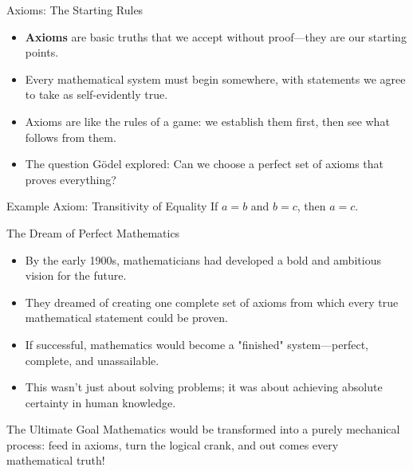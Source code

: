 \documentclass[aspectratio=169]{beamer}
\begin{document}
\begin{frame}{Axioms: The Starting Rules}

\begin{itemize}
    \item \textbf{Axioms} are basic truths that we accept without proof—they are our starting points.
    \item Every mathematical system must begin somewhere, with statements we agree to take as self-evidently true.
    \item Axioms are like the rules of a game: we establish them first, then see what follows from them.
    \item The question Gödel explored: Can we choose a perfect set of axioms that proves everything?
\end{itemize}

\begin{block}{Example Axiom: Transitivity of Equality}
If $a = b$ and $b = c$, then $a = c$.
\end{block}

\end{frame}

\begin{frame}{The Dream of Perfect Mathematics}

\begin{itemize}
    \item By the early 1900s, mathematicians had developed a bold and ambitious vision for the future.
    \item They dreamed of creating one complete set of axioms from which every true mathematical statement could be proven.
    \item If successful, mathematics would become a "finished" system—perfect, complete, and unassailable.
    \item This wasn't just about solving problems; it was about achieving absolute certainty in human knowledge.
\end{itemize}

\begin{alertblock}{The Ultimate Goal}
Mathematics would be transformed into a purely mechanical process: feed in axioms, turn the logical crank, and out comes every mathematical truth!
\end{alertblock}

\end{frame}
\end{document}
